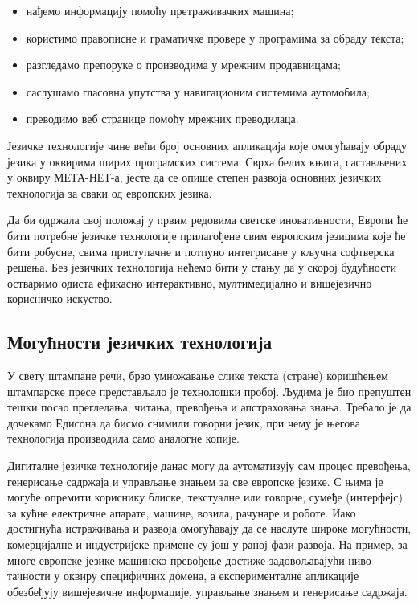 {\begin{multicols}{2}
\begin{itemize}
\item нађемо информацију помоћу претраживачких машина;
\item користимо правописне и граматичке провере у програмима за о\-бра\-ду текста;
\item разгледамо препоруке о производима у мрежним продавницама;
\item саслушамо гласовна упутства у навигационим системима аутомобила;
\item преводимо веб странице помоћу мрежних преводилаца.
\end{itemize}

Језичке технологије чине већи број основних апликација које омогућавају обраду језика у оквирима ширих програмских система. Сврха белих књига, састављених у оквиру МЕТА-НЕТ-а, јесте да се опише степен развоја основних језичких технологија за сваки од европских језика. 


Да би одржала свој положај у првим редовима светске иновативности, Европи ће бити потребне језичке технологије прилагођене свим европским језицима које ће бити робусне, свима приступачне и потпуно интегрисане у кључна софтверска решења. Без језичких технологија нећемо бити у стању да у скорој будућности остваримо одиста ефикасно интерактивно, мултимедијално и вишејезично корисничко искуство.

\subsection {Могућности језичких технологија}
  

У свету штампане речи, брзо умножавање слике текста (стране) коришћењем штампарске пресе пред\-став\-ља\-ло је технолошки пробој. Људима је био препуштен тешки посао прегледања, читања, превођења и апстраховања знања. Требало је да дочекамо Едисона да бисмо снимили говорни језик, при чему је његова технологија производила само аналогне копије.

Дигиталне језичке технологије данас могу да аутоматизују сам процес превођења, генерисање садржаја и управљање знањем за све европске језике. С њима је могуће опремити кориснику блиске, текстуалне или говорне, сумеђе (интерфејс) за кућне електричне апарате,  машине, возила, рачунаре и роботе. Иако достигнућа истраживања и развоја омогућавају да се наслуте широке могућности, комерцијалне и индустријске примене су још у раној фази развоја. На пример, за многе европске језике машинско превођење достиже задовољавајући ниво тачности у оквиру специфичних домена, а експерименталне апликације обезбеђују вишејезичне информације, управљање знањем и генерисање садржаја. 


\end{multicols}}
